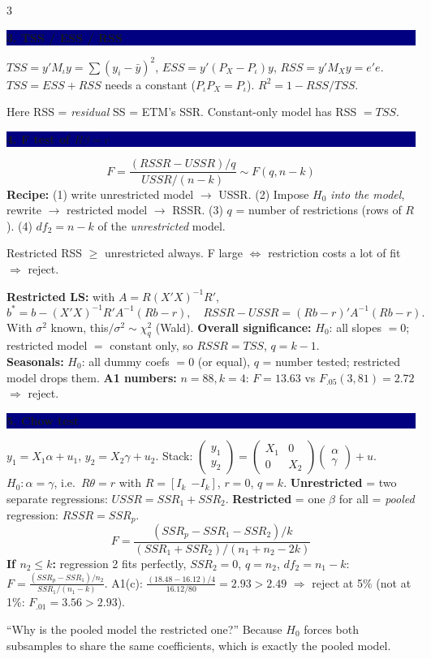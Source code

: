 \documentclass[7.5pt,landscape]{extarticle}
\newcommand{\hd}[1]{\par\vspace{3pt}\noindent\colorbox{navy}{\parbox{\dimexpr\linewidth-2\fboxsep}{\color{white}\bfseries #1}}\par\vspace{1pt}}
\newcommand{\think}[1]{\par\noindent{\color{grn}\textbf{Think:}} {\color{grn}#1}\par}
\newcommand{\warn}[1]{\par\noindent{\color{red}\textbf{Slip:}} {\color{red}#1}\par}
\begin{document}
\begin{multicols}{3}
\hd{3. TSS / ESS / RSS}
$TSS=y'M_\iota y=\sum(y_i-\bar y)^2$,\; $ESS=y'(P_X-P_\iota)y$,\; $RSS=y'M_Xy=e'e$.\\
$TSS=ESS+RSS$ needs a constant ($P_\iota P_X=P_\iota$). $R^2=1-RSS/TSS$.
\warn{Here RSS = \emph{residual} SS = ETM's SSR. Constant-only model has RSS $=TSS$.}

\hd{4. F test of $R\beta=r$}
$$F=\frac{(RSSR-USSR)/q}{USSR/(n-k)}\sim F(q,n-k)$$
\textbf{Recipe:} (1) write unrestricted model $\to$ USSR. (2) Impose $H_0$ \emph{into the model}, rewrite $\to$ restricted model $\to$ RSSR. (3) $q$ = number of restrictions (rows of $R$). (4) $df_2=n-k$ of the \emph{unrestricted} model.
\think{Restricted RSS $\ge$ unrestricted always. F large $\Leftrightarrow$ restriction costs a lot of fit $\Rightarrow$ reject.}
\textbf{Restricted LS:} with $A=R(X'X)^{-1}R'$,
$$b^*=b-(X'X)^{-1}R'A^{-1}(Rb-r),\quad RSSR-USSR=(Rb-r)'A^{-1}(Rb-r).$$
With $\sigma^2$ known, this$/\sigma^2\sim\chi^2_q$ (Wald).
\textbf{Overall significance:} $H_0$: all slopes $=0$; restricted model $=$ constant only, so $RSSR=TSS$, $q=k-1$.\\
\textbf{Seasonals:} $H_0$: all dummy coefs $=0$ (or equal), $q$ = number tested; restricted model drops them.
\textbf{A1 numbers:} $n=88,k=4$: $F=13.63$ vs $F_{.05}(3,81)=2.72$ $\Rightarrow$ reject.

\hd{5. Chow test}
$y_1=X_1\alpha+u_1$, $y_2=X_2\gamma+u_2$. Stack: $\begin{pmatrix}y_1\\y_2\end{pmatrix}=\begin{pmatrix}X_1&0\\0&X_2\end{pmatrix}\begin{pmatrix}\alpha\\\gamma\end{pmatrix}+u$.\\
$H_0:\alpha=\gamma$, i.e.\ $R\theta=r$ with $R=[I_k\ \ {-I_k}]$, $r=0$, $q=k$.
\textbf{Unrestricted} = two separate regressions: $USSR=SSR_1+SSR_2$. \textbf{Restricted} = one $\beta$ for all = \emph{pooled} regression: $RSSR=SSR_p$.
$$F=\frac{(SSR_p-SSR_1-SSR_2)/k}{(SSR_1+SSR_2)/(n_1+n_2-2k)}$$
\textbf{If $n_2\le k$:} regression 2 fits perfectly, $SSR_2=0$, $q=n_2$, $df_2=n_1-k$:
$F=\frac{(SSR_p-SSR_1)/n_2}{SSR_1/(n_1-k)}$. A1(c): $\frac{(18.48-16.12)/4}{16.12/80}=2.93>2.49$ $\Rightarrow$ reject at 5\% (not at 1\%: $F_{.01}=3.56>2.93$).
\think{``Why is the pooled model the restricted one?'' Because $H_0$ forces both subsamples to share the same coefficients, which is exactly the pooled model.}


\end{multicols}
\end{document}
